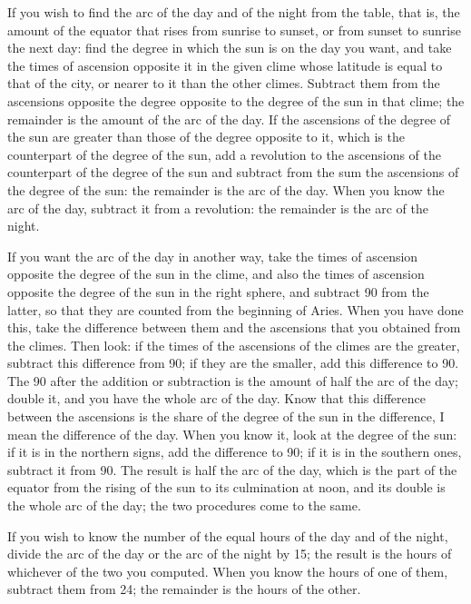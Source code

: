 \documentclass[11pt]{article}
\newcommand{\ArPage}[1]{\marginpar{\footnotesize\color{gray}Ar.\,p.\,#1}}
\begin{document}
\par \ArPage{42}If you wish to find the arc of the day and of the night from the table, that is, the amount of the equator that rises from sunrise to sunset, or from sunset to sunrise the next day: find the degree in which the sun is on the day you want, and take the times of ascension opposite it in the given clime whose latitude is equal to that of the city, or nearer to it than the other climes. Subtract them from the ascensions opposite the degree opposite to the degree of the sun in that clime; the remainder is the amount of the arc of the day. If the ascensions of the degree of the sun are greater than those of the degree opposite to it, which is the counterpart of the degree of the sun, add a revolution to the ascensions of the counterpart of the degree of the sun and subtract from the sum the ascensions of the degree of the sun: the remainder is the arc of the day. When you know the arc of the day, subtract it from a revolution: the remainder is the arc of the night.\par
\par If you want the arc of the day in another way, take the times of ascension opposite the degree of the sun in the clime, and also the times of ascension opposite the degree of the sun in the right sphere, and subtract 90 from the latter, so that they are counted from the beginning of Aries. When you have done this, take the difference between them and the ascensions that you obtained from the climes. Then look: if the times of the ascensions of the climes are the greater, subtract this difference from 90; if they are the smaller, add this difference to 90. The 90 after the addition or subtraction is the amount of half the arc of the day; double it, and you have the whole arc of the day. Know that this difference between the ascensions is the share of the degree of the sun in the difference, I mean the difference of the day. When you know it, look at the degree of the sun: if it is in the northern signs, add the difference to 90; if it is in the southern ones, subtract it from 90. The result is half the arc of the day, which is the part of the equator from the rising of the sun to its culmination at noon, and its double is the whole arc of the day; the two procedures come to the same.\par
\par If you wish to know the number of the equal hours of the day and of the night, divide the arc of the day or the arc of the night by 15; the result is the hours of whichever of the two you computed. When you know the hours of one of them, subtract them from 24; the remainder is the hours of the other.\par
\end{document}
